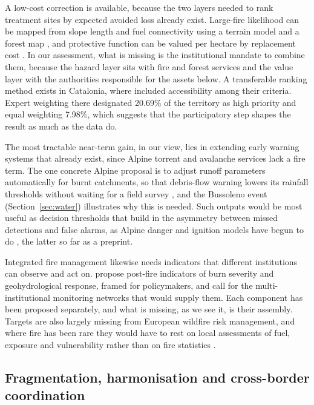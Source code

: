 \documentclass[11pt,a4paper]{article}
\begin{document}
A low-cost correction is available, because the two layers needed to rank treatment sites by expected avoided loss already exist. Large-fire likelihood can be mapped from slope length and fuel connectivity using a terrain model and a forest map \citep{conedera_linking_2024}, and protective function can be valued per hectare by replacement cost \citep{accastello_asforesee_2019}. In our assessment, what is missing is the institutional mandate to combine them, because the hazard layer sits with fire and forest services and the value layer with the authorities responsible for the assets below. A transferable ranking method exists in Catalonia, where \citet{krsnik_spatial_2024} included accessibility among their criteria. Expert weighting there designated 20.69\% of the territory as high priority and equal weighting 7.98\%, which suggests that the participatory step shapes the result as much as the data do.

The most tractable near-term gain, in our view, lies in extending early warning systems that already exist, since Alpine torrent and avalanche services lack a fire term. The one concrete Alpine proposal is to adjust runoff parameters automatically for burnt catchments, so that debris-flow warning lowers its rainfall thresholds without waiting for a field survey \citep{tiranti_wildfires_2021}, and the Bussoleno event (Section~\ref{sec:water}) illustrates why this is needed. Such outputs would be most useful as decision thresholds that build in the asymmetry between missed detections and false alarms, as Alpine danger and ignition models have begun to do \citep{muller_towards_2020, moreno_spacetime_2025}, the latter so far as a preprint.

Integrated fire management likewise needs indicators that different institutions can observe and act on. \citet{melzner_wildfire-induced_2025} propose post-fire indicators of burn severity and geohydrological response, framed for policymakers, and \citet{baselt_compound_2026} call for the multi-institutional monitoring networks that would supply them. Each component has been proposed separately, and what is missing, as we see it, is their assembly. Targets are also largely missing from European wildfire risk management, and where fire has been rare they would have to rest on local assessments of fuel, exposure and vulnerability rather than on fire statistics \citep{berchtold_towards_2025}.

\subsection{Fragmentation, harmonisation and cross-border coordination}
\end{document}
